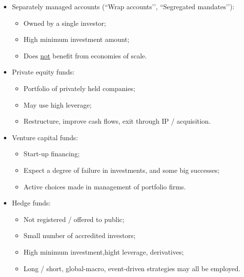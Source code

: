 \documentclass[../notes_compiled.tex]{subfiles}
\begin{document}
\begin{itemize}
\begin{itemize}
\item Trade like shares on an exchange, and can be shorted or margined;
\item Dividend typically paid out to investors;
\item In-kind subscription and redemption keep market price close to NAV.
\begin{itemize}
\item Shares in an ETF are exchanged for baskets of securities in the underlying index by market-makers.
\end{itemize}
\end{itemize}
\item Separately managed accounts (``Wrap accounts’’, ``Segregated mandates’’):
\begin{itemize}
\item Owned by a single investor;
\item High minimum investment amount;
\item Does \underline{not} benefit from economies of scale.
\end{itemize}
\item Private equity funds:
\begin{itemize}
\item Portfolio of privately held companies;
\item May use high leverage;
\item Restructure, improve cash flows, exit through IP / acquisition.
\end{itemize}
\item Venture capital funds:
\begin{itemize}
\item Start-up financing;
\item Expect a degree of failure in investments, and some big successes;
\item Active choices made in management of portfolio firms.
\end{itemize}
\item Hedge funds:
\begin{itemize}
\item Not registered / offered to public;
\item Small number of accredited investors;
\item High minimum investment,hight leverage, derivatives;
\item Long / short, global-macro, event-driven strategies may all be employed.
\end{itemize}
\end{itemize}
\end{document}
